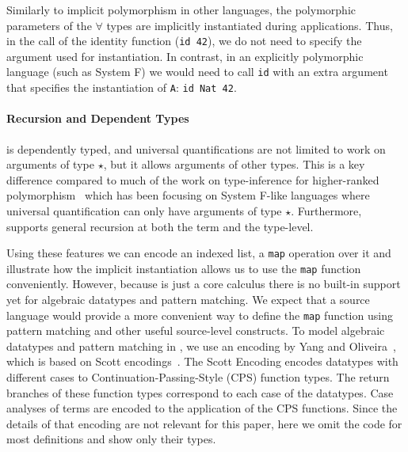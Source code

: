 Similarly to implicit polymorphism in other languages,
the polymorphic parameters of the $\forall$ types are implicitly instantiated
during applications. Thus, in the call of the identity function (\lstinline{id 42}), we
do not need to specify the argument used for instantiation. In contrast,
in an explicitly polymorphic language (such as System F) we would need
to call \lstinline{id} with an extra argument that specifies the instantiation of \lstinline{A}:
\lstinline{id Nat 42}.

\paragraph{Recursion and Dependent Types}

\name is dependently typed, and universal quantifications are not limited to work
on arguments of type $\star$, but it allows arguments of other types. This is
a key difference compared to much of the work on type-inference for higher-ranked
polymorphism~\cite{dunfield2013complete,le2003ml,leijen2008hmf,vytiniotis2008fph,jones2007practical}
which has been focusing on System F-like
languages where universal quantification can only have arguments of type $\star$.
Furthermore, \name supports general recursion at both the term and the type-level.

Using these features we can encode an indexed list, a \lstinline{map} operation over it
and illustrate how the implicit instantiation allows us to use the \lstinline{map}
function conveniently.
However, because \name is just a core calculus there is no built-in support
yet for algebraic datatypes and pattern matching.
We expect that a source language would provide a more convenient
way to define the \lstinline{map} function using pattern matching and other useful source-level
constructs. To model algebraic datatypes and pattern matching in \name, we
use an encoding by Yang and Oliveira~\cite{yang2019pure},
which is based on Scott encodings~\cite{mogensen1992efficient}.
The Scott Encoding encodes datatypes with different cases to
Continuation-Passing-Style (CPS) function types. The return branches of these
function types correspond to each case of the datatypes.
Case analyses of terms are encoded to the application of the CPS functions.
Since the details of that encoding are not relevant for this paper,
here we omit the code for most definitions and show only their types.

